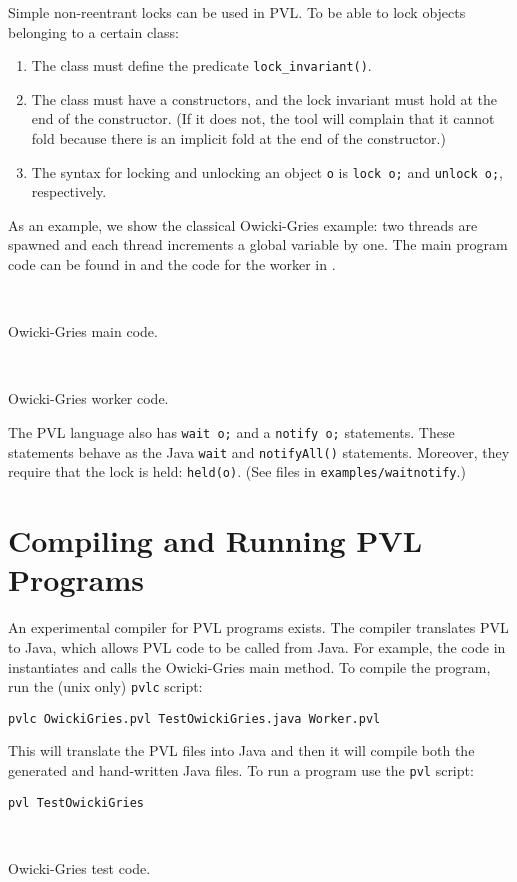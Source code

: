 Simple non-reentrant locks can be used in PVL.
To be able to lock objects belonging to a certain class:
\begin{enumerate}
\item The class must define the predicate \lstinline+lock_invariant()+.
\item The class must have a constructors, and the lock
invariant must hold at the end of the constructor. (If it does not, the tool
will complain that it cannot fold because there is an implicit fold at the end of the constructor.)
\item The syntax for locking and unlocking an object \lstinline+o+ is \lstinline+lock o;+
and \lstinline+unlock o;+, respectively.
\end{enumerate}


As an example, we show the classical Owicki-Gries example: two threads are spawned and each
thread increments a global variable by one. The main program code can be found in
 and the code for the worker in .

\begin{listing}
 
\caption{Owicki-Gries main code.}
\label{og main}
\end{listing}

\begin{listing}
 
\caption{Owicki-Gries worker code.}
\label{og worker}
\end{listing}

The PVL language also has \lstinline+wait o;+ and
a \lstinline+notify o;+ statements. These statements behave as the Java \lstinline+wait+
and \lstinline+notifyAll()+ statements. Moreover, they require that the lock is held:
\lstinline+held(o)+. (See files in \verb+examples/waitnotify+.)

\section{Compiling and Running PVL Programs}

An experimental compiler for PVL programs exists. The compiler
translates PVL to Java, which allows PVL code to be called from Java.
For example, the code in  instantiates and calls
the Owicki-Gries main method.
To compile the program, run the (unix only) \verb+pvlc+ script:
\begin{verbatim}
pvlc OwickiGries.pvl TestOwickiGries.java Worker.pvl
\end{verbatim}
This will translate the PVL files into Java and then it will compile
both the generated and hand-written Java files.
To run a program use the \verb+pvl+ script:
\begin{verbatim}
pvl TestOwickiGries
\end{verbatim}

\begin{listing}
 
\caption{Owicki-Gries test code.}
\label{og test}
\end{listing}


